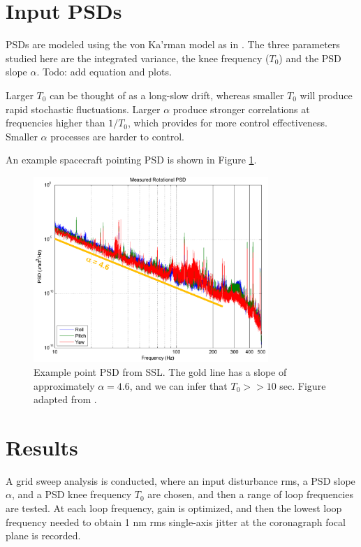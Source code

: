\documentclass[10pt,preprint]{aastex631}
\begin{document}
\section{Input PSDs}

PSDs are modeled using the von Ka'rman model as in \citet{2019AJ....157...36D}.  The three parameters studied here are the integrated variance, the knee frequency ($T_0$) and the PSD slope $\alpha$.  Todo: add equation and plots.

Larger $T_0$ can be thought of as a long-slow drift, whereas smaller $T_0$ will produce rapid stochastic fluctuations.  Larger $\alpha$ produce stronger correlations at frequencies higher than $1/T_0$, which provides for more control effectiveness.  Smaller $\alpha$ processes are harder to control.

An example spacecraft pointing PSD is shown in Figure \ref{fig:examp_psd}. 

\begin{figure}
\centering
\includegraphics[width=3.5in]{ssl_example.png}
\caption{Example point PSD from SSL.  The gold line has a slope of approximately $\alpha=4.6$, and we can infer that $T_0 >> 10$ sec.  Figure adapted from \citet{woo:2017}. \label{fig:examp_psd}}
\end{figure}

\section{Results}

A grid sweep analysis is conducted, where an input disturbance rms, a PSD slope $\alpha$, and a PSD knee frequency $T_0$ are chosen, and then a range of loop frequencies are tested.  At each loop frequency, gain is optimized, and then the lowest loop frequency needed to obtain 1 nm rms single-axis jitter at the coronagraph focal plane is recorded.  
\end{document}
